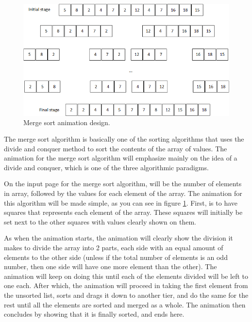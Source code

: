 \begin{figure}[H]
\centering
\includegraphics[scale=0.9]{images/report_images/animationDesignMergeSort.png}
\caption{Merge sort animation design.}
\label{animationDesignMergeSort}
\end{figure}

The merge sort algorithm is basically one of the sorting algorithms that uses the divide and conquer method to sort the contents of the array of values. The animation for the merge sort algorithm will emphasize mainly on the idea of a divide and conquer, which is one of the three algorithmic paradigms. 

On the input page for the merge sort algorithm, will be the number of elements in array, followed by the values for each element of the array. The animation for this algorithm will be made simple, as you can see in figure \ref{animationDesignMergeSort}. First, is to have squares that represents each element of the array. These squares will initially be set next to the other squares with values clearly shown on them.

As when the animation starts, the animation will clearly show the division it makes to divide the array into 2 parts, each side with an equal amount of elements to the other side (unless if the total number of elements is an odd number, then one side will have one more element than the other). The animation will keep on doing this until each of the elements divided will be left to one each. After which, the animation will proceed in taking the first element from the unsorted list, sorts and drags it down to another tier, and do the same for the rest until all the elements are sorted and merged as a whole. The animation then concludes by showing that it is finally sorted, and ends here.

